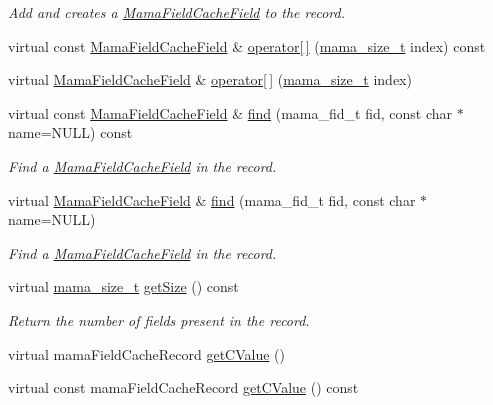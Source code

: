 \begin{DoxyCompactItemize}
\begin{DoxyCompactList}\small\item\em Add and creates a {\ttfamily \hyperlink{classWombat_1_1MamaFieldCacheField}{MamaFieldCacheField}} to the record. \item\end{DoxyCompactList}\item 
virtual const \hyperlink{classWombat_1_1MamaFieldCacheField}{MamaFieldCacheField} \& \hyperlink{classWombat_1_1MamaFieldCacheRecord_a9f4ac2fab76927ae0895eb2c2b6cfdb3}{operator\mbox{[}$\,$\mbox{]}} (\hyperlink{classmama__size__t}{mama\_\-size\_\-t} index) const 
\item 
virtual \hyperlink{classWombat_1_1MamaFieldCacheField}{MamaFieldCacheField} \& \hyperlink{classWombat_1_1MamaFieldCacheRecord_ad4a6754e503f14e6bc28690754fb8f38}{operator\mbox{[}$\,$\mbox{]}} (\hyperlink{classmama__size__t}{mama\_\-size\_\-t} index)
\item 
virtual const \hyperlink{classWombat_1_1MamaFieldCacheField}{MamaFieldCacheField} \& \hyperlink{classWombat_1_1MamaFieldCacheRecord_a48049a7dd4f0302cb9f8ef406a1e493f}{find} (mama\_\-fid\_\-t fid, const char $\ast$name=NULL) const 
\begin{DoxyCompactList}\small\item\em Find a {\ttfamily \hyperlink{classWombat_1_1MamaFieldCacheField}{MamaFieldCacheField}} in the record. \item\end{DoxyCompactList}\item 
virtual \hyperlink{classWombat_1_1MamaFieldCacheField}{MamaFieldCacheField} \& \hyperlink{classWombat_1_1MamaFieldCacheRecord_a7fa34fa26487e5fc71dc6b41c13cef30}{find} (mama\_\-fid\_\-t fid, const char $\ast$name=NULL)
\begin{DoxyCompactList}\small\item\em Find a {\ttfamily \hyperlink{classWombat_1_1MamaFieldCacheField}{MamaFieldCacheField}} in the record. \item\end{DoxyCompactList}\item 
virtual \hyperlink{classmama__size__t}{mama\_\-size\_\-t} \hyperlink{classWombat_1_1MamaFieldCacheRecord_a61c3ceeeab9bcbd69338bb1398bb4640}{getSize} () const 
\begin{DoxyCompactList}\small\item\em Return the number of fields present in the record. \item\end{DoxyCompactList}\item 
virtual mamaFieldCacheRecord \hyperlink{classWombat_1_1MamaFieldCacheRecord_a03798d4fa8f54c2181763ea331a4808d}{getCValue} ()
\item 
virtual const mamaFieldCacheRecord \hyperlink{classWombat_1_1MamaFieldCacheRecord_ac112360a7a4862505635b6a235f2a214}{getCValue} () const 
\end{DoxyCompactItemize}


